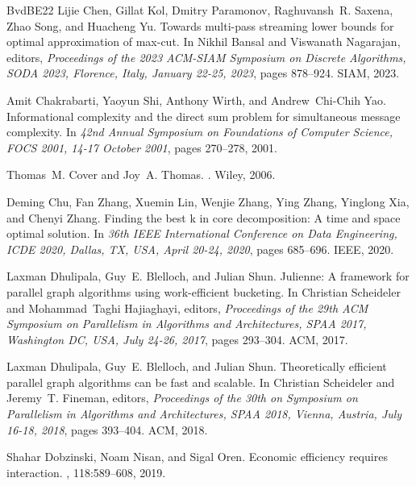 \documentclass[11pt,letterpaper]{article}
\theoremstyle{definition}
\begin{document}
\begin{thebibliography}{BvdBE{\etalchar{+}}22}
Lijie Chen, Gillat Kol, Dmitry Paramonov, Raghuvansh~R. Saxena, Zhao Song, and Huacheng Yu.
\newblock Towards multi-pass streaming lower bounds for optimal approximation of max-cut.
\newblock In Nikhil Bansal and Viswanath Nagarajan, editors, {\em Proceedings of the 2023 {ACM-SIAM} Symposium on Discrete Algorithms, {SODA} 2023, Florence, Italy, January 22-25, 2023}, pages 878--924. {SIAM}, 2023.

Amit Chakrabarti, Yaoyun Shi, Anthony Wirth, and Andrew~Chi{-}Chih Yao.
\newblock Informational complexity and the direct sum problem for simultaneous message complexity.
\newblock In {\em 42nd Annual Symposium on Foundations of Computer Science, {FOCS} 2001, 14-17 October 2001}, pages 270--278, 2001.

Thomas~M. Cover and Joy~A. Thomas.
.
\newblock Wiley, 2006.

Deming Chu, Fan Zhang, Xuemin Lin, Wenjie Zhang, Ying Zhang, Yinglong Xia, and Chenyi Zhang.
\newblock Finding the best k in core decomposition: {A} time and space optimal solution.
\newblock In {\em 36th {IEEE} International Conference on Data Engineering, {ICDE} 2020, Dallas, TX, USA, April 20-24, 2020}, pages 685--696. {IEEE}, 2020.

Laxman Dhulipala, Guy~E. Blelloch, and Julian Shun.
\newblock Julienne: {A} framework for parallel graph algorithms using work-efficient bucketing.
\newblock In Christian Scheideler and Mohammad~Taghi Hajiaghayi, editors, {\em Proceedings of the 29th {ACM} Symposium on Parallelism in Algorithms and Architectures, {SPAA} 2017, Washington DC, USA, July 24-26, 2017}, pages 293--304. {ACM}, 2017.

Laxman Dhulipala, Guy~E. Blelloch, and Julian Shun.
\newblock Theoretically efficient parallel graph algorithms can be fast and scalable.
\newblock In Christian Scheideler and Jeremy~T. Fineman, editors, {\em Proceedings of the 30th on Symposium on Parallelism in Algorithms and Architectures, {SPAA} 2018, Vienna, Austria, July 16-18, 2018}, pages 393--404. {ACM}, 2018.

Shahar Dobzinski, Noam Nisan, and Sigal Oren.
\newblock Economic efficiency requires interaction.
, 118:589--608, 2019.


\end{thebibliography}
\end{document}
